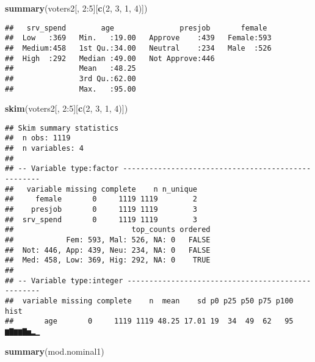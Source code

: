 \documentclass[]{article}
\newenvironment{Shaded}{\begin{snugshade}}{\end{snugshade}}
\newcommand{\KeywordTok}[1]{\textcolor[rgb]{0.13,0.29,0.53}{\textbf{{#1}}}}
\newcommand{\DecValTok}[1]{\textcolor[rgb]{0.00,0.00,0.81}{{#1}}}
\newcommand{\NormalTok}[1]{{#1}}
\begin{document}
\begin{Shaded}
\begin{Highlighting}[]
\KeywordTok{summary}\NormalTok{(voters2[, }\DecValTok{2}\NormalTok{:}\DecValTok{5}\NormalTok{][}\KeywordTok{c}\NormalTok{(}\DecValTok{2}\NormalTok{, }\DecValTok{3}\NormalTok{, }\DecValTok{1}\NormalTok{, }\DecValTok{4}\NormalTok{)])}
\end{Highlighting}
\end{Shaded}

\begin{verbatim}
##   srv_spend        age               presjob       female   
##  Low   :369   Min.   :19.00   Approve    :439   Female:593  
##  Medium:458   1st Qu.:34.00   Neutral    :234   Male  :526  
##  High  :292   Median :49.00   Not Approve:446               
##               Mean   :48.25                                 
##               3rd Qu.:62.00                                 
##               Max.   :95.00
\end{verbatim}

\begin{Shaded}
\begin{Highlighting}[]
\KeywordTok{skim}\NormalTok{(voters2[, }\DecValTok{2}\NormalTok{:}\DecValTok{5}\NormalTok{][}\KeywordTok{c}\NormalTok{(}\DecValTok{2}\NormalTok{, }\DecValTok{3}\NormalTok{, }\DecValTok{1}\NormalTok{, }\DecValTok{4}\NormalTok{)])}
\end{Highlighting}
\end{Shaded}

\begin{verbatim}
## Skim summary statistics
##  n obs: 1119 
##  n variables: 4 
## 
## -- Variable type:factor ---------------------------------------------------
##   variable missing complete    n n_unique
##     female       0     1119 1119        2
##    presjob       0     1119 1119        3
##  srv_spend       0     1119 1119        3
##                           top_counts ordered
##            Fem: 593, Mal: 526, NA: 0   FALSE
##  Not: 446, App: 439, Neu: 234, NA: 0   FALSE
##  Med: 458, Low: 369, Hig: 292, NA: 0    TRUE
## 
## -- Variable type:integer --------------------------------------------------
##  variable missing complete    n  mean    sd p0 p25 p50 p75 p100     hist
##       age       0     1119 1119 48.25 17.01 19  34  49  62   95 ▆▇▆▆▇▅▂▁
\end{verbatim}

\begin{Shaded}
\begin{Highlighting}[]
\KeywordTok{summary}\NormalTok{(mod.nominal1)}
\end{Highlighting}
\end{Shaded}
\end{document}

